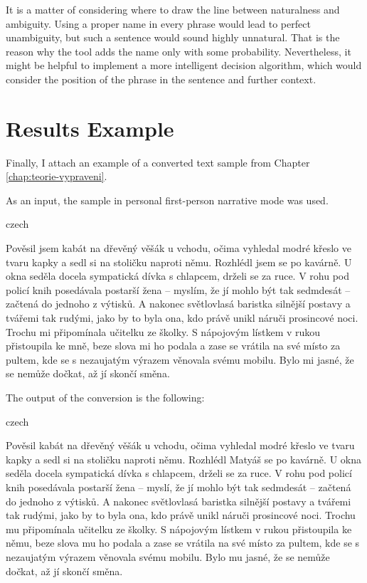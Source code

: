 It is a matter of considering where to draw the line between naturalness and ambiguity. Using a proper name in every phrase would lead to perfect unambiguity, but such a sentence would sound highly unnatural. That is the reason why the tool adds the name only with some probability. Nevertheless, it might be helpful to implement a more intelligent decision algorithm, which would consider the position of the phrase in the sentence and further context.


\section{Results Example}

Finally, I attach an example of a converted text sample from Chapter \ref{chap:teorie-vypraveni}.

As an input, the sample in personal first-person narrative mode was used.
\newline

\begin{otherlanguage*}{czech}
\begin{quoting}
Pověsil jsem kabát na dřevěný věšák u vchodu, očima vyhledal modré křeslo ve tvaru kapky a sedl si na stoličku naproti němu. Rozhlédl jsem se po kavárně. U okna seděla docela sympatická dívka s chlapcem, drželi se za ruce. V rohu pod policí knih posedávala postarší žena -- myslím, že jí mohlo být tak sedmdesát -- začtená do jednoho z výtisků. A nakonec světlovlasá baristka silnější postavy a tvářemi tak rudými, jako by to byla ona, kdo právě unikl náruči prosincové noci. Trochu mi připomínala učitelku ze školky. S nápojovým lístkem v rukou přistoupila ke mně, beze slova mi ho podala a zase se vrátila na své místo za pultem, kde se s nezaujatým výrazem věnovala svému mobilu. Bylo mi jasné, že se nemůže dočkat, až jí skončí směna. \newline
\end{quoting}
\end{otherlanguage*}

The output of the conversion is the following:
\newline
\begin{otherlanguage*}{czech}
\begin{quoting}
Pověsil kabát na dřevěný věšák u vchodu, očima vyhledal modré křeslo ve tvaru kapky a sedl si na stoličku naproti němu. Rozhlédl Matyáš se po kavárně. U okna seděla docela sympatická dívka s chlapcem, drželi se za ruce. V rohu pod policí knih posedávala postarší žena -- myslí, že jí mohlo být tak sedmdesát -- začtená do jednoho z výtisků. A nakonec světlovlasá baristka silnější postavy a tvářemi tak rudými, jako by to byla ona, kdo právě unikl náruči prosincové noci. Trochu mu připomínala učitelku ze školky. S nápojovým lístkem v rukou přistoupila ke němu, beze slova mu ho podala a zase se vrátila na své místo za pultem, kde se s nezaujatým výrazem věnovala svému mobilu. Bylo mu jasné, že se nemůže dočkat, až jí skončí směna.
\newline
\end{quoting}
\end{otherlanguage*}

